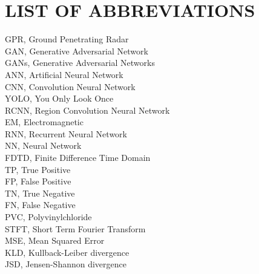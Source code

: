 \chapter*{LIST OF ABBREVIATIONS}
\vspace{\baselineskip}
\begin{flushleft}
GPR, Ground Penetrating Radar\\
\vspace{\baselineskip}
GAN, Generative Adversarial Network\\
\vspace{\baselineskip}
GANs, Generative Adversarial Networks\\
\vspace{\baselineskip}
ANN, Artificial Neural Network\\
\vspace{\baselineskip}
CNN, Convolution Neural Network\\
\vspace{\baselineskip}
YOLO, You Only Look Once\\
\vspace{\baselineskip}
RCNN, Region Convolution Neural Network\\
\vspace{\baselineskip}
EM, Electromagnetic\\
\vspace{\baselineskip}
RNN, Recurrent Neural Network\\
\vspace{\baselineskip}
NN, Neural Network\\
\vspace{\baselineskip}
FDTD, Finite Difference Time Domain\\
\vspace{\baselineskip}
TP, True Positive\\
\vspace{\baselineskip}
FP, False Positive\\
\vspace{\baselineskip}
TN, True Negative\\
\vspace{\baselineskip}
FN, False Negative\\
\vspace{\baselineskip}
PVC, Polyvinylchloride\\
\vspace{\baselineskip}
STFT, Short Term Fourier Transform\\
\vspace{\baselineskip}
MSE, Mean Squared Error\\
\vspace{\baselineskip}
KLD, Kullback-Leiber divergence\\
\vspace{\baselineskip}
JSD, Jensen-Shannon divergence\\
\end{flushleft}